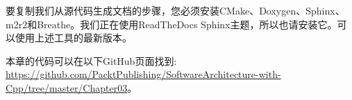 要复制我们从源代码生成文档的步骤，您必须安装CMake、Doxygen、Sphinx、m2r2和Breathe。我们正在使用ReadTheDocs Sphinx主题，所以也请安装它。可以使用上述工具的最新版本。

本章的代码可以在以下GitHub页面找到: \url{https://github.com/PacktPublishing/SoftwareArchitecture-with-Cpp/tree/master/Chapter03}。